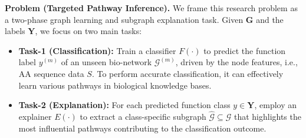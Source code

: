 
\noindent\textbf{Problem (Targeted Pathway Inference).}
We frame this research problem as a two-phase graph learning and subgraph explanation task.
Given $\mathbf{G}$ and the labels $\mathbf{Y}$, we focus on two main tasks:
\begin{itemize}[left=0pt]
    \item \textbf{Task-1 (Classification):} 
    Train a classifier $F(\cdot)$ to predict the function label $y^{(m)}$ of an unseen bio-network $\mathcal{G}^{(m)}$, driven by the node features, i.e., AA sequence data $S$.
    To perform accurate classification, it can effectively learn various pathways in biological knowledge bases.
    
    \item \textbf{Task-2 (Explanation):} 
    For each predicted function class $y \in \mathbf{Y}$, employ an explainer $E(\cdot)$ to extract a class-specific subgraph $\hat{\mathcal{G}} \subseteq \mathcal{G}$ that highlights the most influential pathways contributing to the classification outcome.
\end{itemize}



